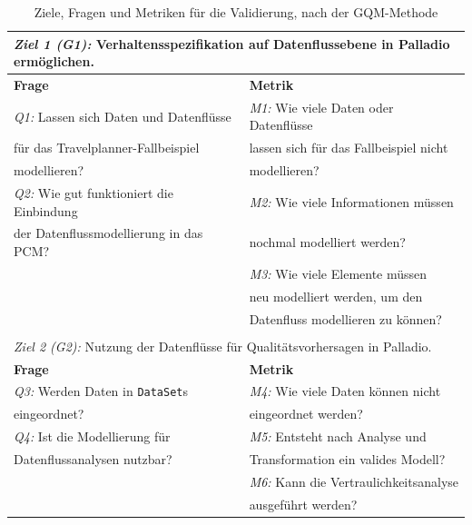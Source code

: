 \begin{table}
\centering
\begin{tabular}{l|l}
\multicolumn{2}{l}{\textit{Ziel 1 (G1):} Verhaltensspezifikation auf
Datenflussebene in Palladio ermöglichen.}
\\\hline
\textbf{Frage} & \textbf{Metrik} \\\hline
\textit{Q1:} Lassen sich Daten und Datenflüsse &\textit{M1:} Wie viele Daten oder Datenflüsse \\
für das Travelplanner-Fallbeispiel & lassen sich für das Fallbeispiel nicht \\
modellieren? & modellieren?\\\hline
\textit{Q2:} Wie gut funktioniert die Einbindung & \textit{M2:} Wie viele Informationen müssen  \\
der Datenflussmodellierung in das PCM? & nochmal modelliert werden? \\
 & \textit{M3:} Wie viele Elemente müssen  \\
 & neu modelliert werden, um den  \\
 & Datenfluss modellieren zu können? \\ \hline 
 \multicolumn{2}{l}{} \\
 \multicolumn{2}{l}{\textit{Ziel 2 (G2):} Nutzung der Datenflüsse für
 Qualitätsvorhersagen in Palladio.} \\\hline
 \textbf{Frage} & \textbf{Metrik} \\\hline
 \textit{Q3:} Werden Daten in \texttt{DataSet}s & \textit{M4:} Wie viele Daten können nicht\\
 eingeordnet? & eingeordnet werden? \\ \hline
\textit{Q4:} Ist die Modellierung für & \textit{M5:} Entsteht nach Analyse und \\
Datenflussanalysen nutzbar? & Transformation ein valides Modell? \\
& \textit{M6:} Kann die Vertraulichkeitsanalyse\\
& ausgeführt werden?
\end{tabular}
\caption{\label{tab:gqm}Ziele, Fragen und Metriken für die Validierung, nach der GQM-Methode}
\end{table}

